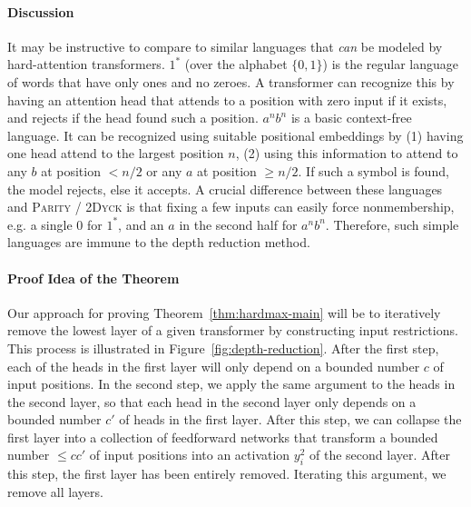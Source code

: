\documentclass[11pt,a4paper]{article}
\begin{document}
\paragraph{Discussion}
It may be instructive to compare to similar languages that \emph{can} be modeled by hard-attention transformers.
$1^*$ (over the alphabet $\{0,1\}$) is the regular language of words that have only ones and no zeroes.
A transformer can recognize this by having an attention head that attends to a position with zero input if it exists, and rejects if the head found such a position.
$a^nb^n$ is a basic context-free language.
It can be recognized using suitable positional embeddings by (1) having one head attend to the largest position $n$, (2) using this information to attend to any $b$ at position $<n/2$ or any $a$ at position $\geq n/2$. If such a symbol is found, the model rejects, else it accepts.
A crucial difference between these languages and \textsc{Parity} / \textsc{2Dyck} is that fixing a few inputs can easily force nonmembership, e.g. a single 0 for $1^*$, and an $a$ in the second half for $a^nb^n$.
Therefore, such simple languages are immune to the depth reduction method.



\paragraph{Proof Idea of the Theorem}
Our approach for proving Theorem~\ref{thm:hardmax-main} will be to iteratively remove the lowest layer of a given transformer by constructing input restrictions.
This process is illustrated in Figure~\ref{fig:depth-reduction}.
After the first step, each of the heads in the first layer will only depend on a bounded number $c$ of input positions.
In the second step, we apply the same argument to the heads in the second layer, so that each head in the second layer only depends on a bounded number $c'$ of heads in the first layer.
After this step, we can collapse the first layer into a collection of feedforward networks that transform a bounded number $\leq cc'$ of input positions into an activation $y_i^2$ of the second layer.
After this step, the first layer has been entirely removed.
Iterating this argument, we remove all layers.
\end{document}
